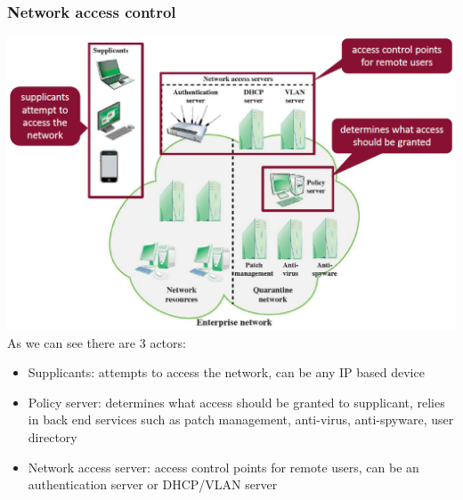 \documentclass[12pt]{article}
\begin{document}
 \subsubsection{Network access control}
 \includegraphics[width=\linewidth]{./slides/L6P2NAC.PNG}\\
 As we can see there are 3 actors:
 \begin{itemize}
 	\item Supplicants: attempts to access the network, can be any IP based device
 	\item Policy server: determines what access should be granted to supplicant, relies in back end services such as patch management, anti-virus, anti-spyware, user directory
 	\item Network access server: access control points for remote users, can be an authentication server or DHCP/VLAN server
 \end{itemize}
 
\end{document}
